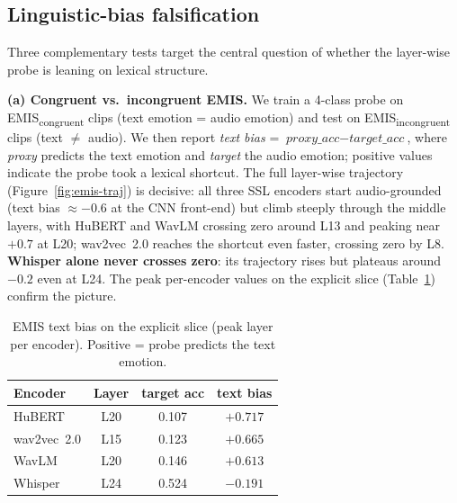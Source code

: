 \documentclass[sigconf,screen]{acmart}
\begin{document}
\subsection{Linguistic-bias falsification}
\label{sec:bias}
Three complementary tests target the central question of whether the layer-wise probe is leaning on lexical structure.

\textbf{(a) Congruent vs.\ incongruent EMIS.} We train a 4-class probe on EMIS\textsubscript{congruent} clips (text emotion = audio emotion) and test on EMIS\textsubscript{incongruent} clips (text $\neq$ audio). We then report \emph{text bias} = $\textit{proxy\_acc} - \textit{target\_acc}$, where \emph{proxy} predicts the text emotion and \emph{target} the audio emotion; positive values indicate the probe took a lexical shortcut. The full layer-wise trajectory (Figure~\ref{fig:emis-traj}) is decisive: all three SSL encoders start audio-grounded (text bias $\approx -0.6$ at the CNN front-end) but climb steeply through the middle layers, with HuBERT and WavLM crossing zero around L13 and peaking near $+0.7$ at L20; wav2vec~2.0 reaches the shortcut even faster, crossing zero by L8. \textbf{Whisper alone never crosses zero}: its trajectory rises but plateaus around $-0.2$ even at L24. The peak per-encoder values on the explicit slice (Table~\ref{tab:emis}) confirm the picture.
\begin{table}[h]
\centering
\small
\caption{EMIS text bias on the explicit slice (peak layer per encoder). Positive = probe predicts the text emotion.}
\label{tab:emis}
\begin{tabular}{lccc}
\toprule
\textbf{Encoder} & \textbf{Layer} & \textbf{target acc} & \textbf{text bias} \\
\midrule
HuBERT      & L20 & 0.107 & $+0.717$ \\
wav2vec~2.0 & L15 & 0.123 & $+0.665$ \\
WavLM       & L20 & 0.146 & $+0.613$ \\
Whisper     & L24 & 0.524 & $-0.191$ \\
\bottomrule
\end{tabular}
\end{table}
\end{document}
